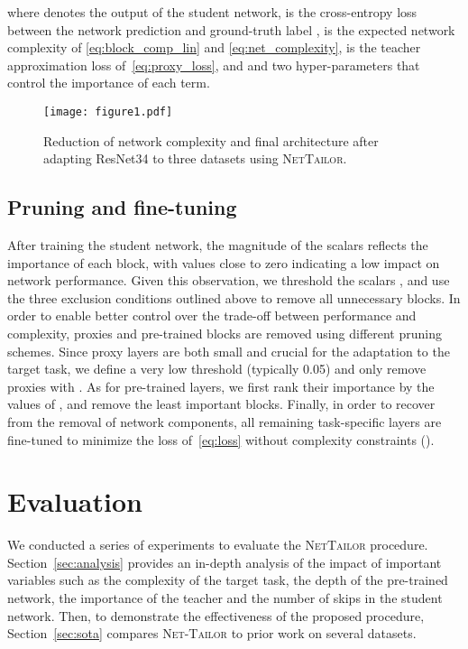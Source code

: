 \documentclass[10pt,twocolumn,letterpaper]{article}
\begin{document}
where  denotes the output of the student network,  is the cross-entropy loss between the network prediction  and ground-truth label ,  is the expected network complexity of \eqref{eq:block_comp_lin} and \eqref{eq:net_complexity},  is the teacher approximation loss of~\eqref{eq:proxy_loss}, and  and  two hyper-parameters that control the importance of each term.

\begin{figure*}[t!]
  \centering
  \texttt{[image: figure1.pdf]}
  \caption{Reduction of network complexity and final architecture after adapting ResNet34 to three datasets using \textsc{NetTailor}.}
  \label{fig:dataset}
\end{figure*}

\subsection{Pruning and fine-tuning}
\vspace{-3pt}
\label{sec:pruning}
After training the student network, the magnitude of the scalars  reflects the importance of each block, with values close to zero indicating a low impact on network performance.
Given this observation, we threshold the scalars , and use the three exclusion conditions outlined above to remove all unnecessary blocks.
In order to enable better control over the trade-off between performance and complexity, proxies and pre-trained blocks are removed using different pruning schemes.
Since proxy layers are both small and crucial for the adaptation to the target task, we define a very low threshold  (typically 0.05) and only remove proxies with .
As for pre-trained layers, we first rank their importance by the values of , and remove the  least important blocks.
Finally, in order to recover from the removal of network components, all remaining task-specific layers are fine-tuned to minimize the loss of~\eqref{eq:loss} without complexity constraints ().
 
\vspace{-3pt}
\section{Evaluation}
\vspace{-3pt}
We conducted a series of experiments to evaluate the \textsc{NetTailor} procedure.
Section~\ref{sec:analysis} provides an in-depth analysis of the impact of important variables such as the complexity of the target task, the depth of the pre-trained network, the importance of the teacher and the number of skips in the student network.
Then, to demonstrate the effectiveness of the proposed procedure, Section~\ref{sec:sota} compares \textsc{Net-Tailor} to prior work on several datasets.
\end{document}
